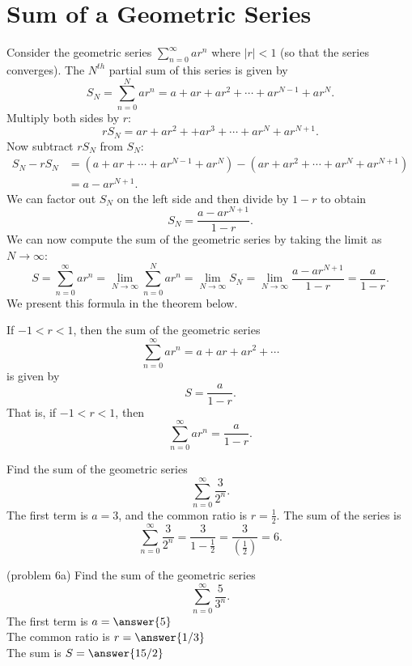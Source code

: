 \documentclass[handout]{ximera}
\begin{document}
\section{Sum of a Geometric Series}

Consider the geometric series $\sum_{n=0}^\infty ar^n$ where $|r| < 1$ (so that the series converges).
The $N^{th}$ partial sum of this series is given by
\[
S_N = \sum_{n=0}^N ar^n = a + ar + ar^2 + \cdots + ar^{N-1} + ar^N.
\]
Multiply both sides by $r$:
\[
rS_N =  ar + ar^2 + + ar^3 + \cdots  + ar^N + ar^{N+1}.
\] 
Now subtract $rS_N$ from $S_N$:
\begin{align*}
S_N - rS_N &= \left(a + ar + \cdots + ar^{N-1} + ar^N\right) - \left(ar + ar^2 + \cdots  + ar^N + ar^{N+1} \right)\\
           &= a - ar^{N+1}.
\end{align*}
We can factor out $S_N$ on the left side and then divide by $1-r$ to obtain
\[
S_N = \frac{a - ar^{N+1}}{1-r}.
\]
We can now compute the sum of the geometric series by taking the limit as $N \to \infty$:
\[
S = \sum_{n=0}^\infty ar^n = \lim_{N \to \infty} \sum_{n=0}^N ar^n = \lim_{N \to \infty} S_N = \lim_{N \to \infty} \frac{a - ar^{N+1}}{1-r} = \frac{a}{1-r}.
\]
We present this formula in the theorem below.

\begin{theorem}
If $-1 < r < 1$, then the sum of the geometric series 
\[
\sum_{n=0}^\infty ar^n = a + ar + ar^2 + \cdots
\] is given by 
\[
S = \frac{a}{1-r}.
\]
That is, if $-1 < r < 1$, then
\[
\sum_{n=0}^\infty ar^n = \frac{a}{1-r}.
\]
\end{theorem}

\begin{example}[example 6]
Find the sum of the geometric series 
\[
\sum_{n=0}^\infty \frac{3}{2^n}.
\]
The first term is $a = 3$, and the common ratio is $r = \frac12$. The sum of the series is
\[
\sum_{n=0}^\infty \frac{3}{2^n} = \frac{3}{1-\frac12} = \frac{3}{\left(\frac12\right)} = 6.
\]
\end{example}


\begin{problem}(problem 6a)
Find the sum of the geometric series 
\[
\sum_{n=0}^\infty \frac{5}{3^n}.
\]
The first term is $a = \answer{5}$\\
The common ratio is $r = \answer{1/3}$\\
The sum is $S= \answer{15/2}$

\end{problem}
\end{document}
